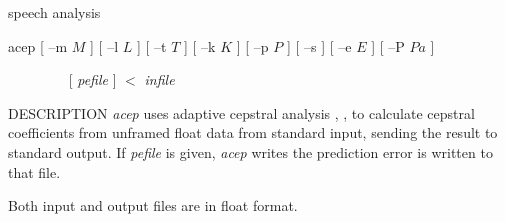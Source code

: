 \hypertarget{acep}{}
%
{speech analysis}
\begin{synopsis}
 \item [acep] [ --m $M$ ] [ --l $L$ ] [ --t $T$ ] [ --k $K$ ]
	      [ --p $P$ ] [ --s ] [ --e $E$ ] [ --P $Pa$ ]
\item [\ ~~~~~~~] [ {\em pefile} ] $<$ {\em infile}
\end{synopsis}

\begin{qsection}{DESCRIPTION}
	{\em acep} uses adaptive cepstral analysis
	\cite{ref:acep-IEICE}, \cite{ref:acep-IEEESP},
	to calculate cepstral coefficients from 
	unframed float data from standard input,
	sending the result to standard output.  
	If {\em pefile} is given,
	{\em acep} writes the prediction error is written to that file.

	Both input and output files are in float format.


\end{qsection}
